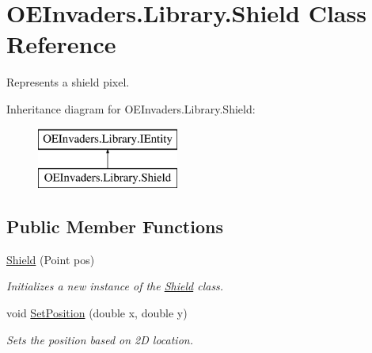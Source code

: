 \hypertarget{class_o_e_invaders_1_1_library_1_1_shield}{}\section{O\+E\+Invaders.\+Library.\+Shield Class Reference}
\label{class_o_e_invaders_1_1_library_1_1_shield}


Represents a shield pixel.  


Inheritance diagram for O\+E\+Invaders.\+Library.\+Shield\+:\begin{figure}[H]
\begin{center}
\leavevmode
\includegraphics[height=2.000000cm]{class_o_e_invaders_1_1_library_1_1_shield}
\end{center}
\end{figure}
\subsection*{Public Member Functions}
\begin{DoxyCompactItemize}
\item 
\mbox{\hyperlink{class_o_e_invaders_1_1_library_1_1_shield_a83a096af7e5531d2a57bbd4164f7a9de}{Shield}} (Point pos)
\begin{DoxyCompactList}\small\item\em Initializes a new instance of the \mbox{\hyperlink{class_o_e_invaders_1_1_library_1_1_shield}{Shield}} class. \end{DoxyCompactList}\item 
void \mbox{\hyperlink{class_o_e_invaders_1_1_library_1_1_shield_ae53b795e54cc3b6f985f8cc823811353}{Set\+Position}} (double x, double y)
\begin{DoxyCompactList}\small\item\em Sets the position based on 2D location. \end{DoxyCompactList}\end{DoxyCompactItemize}
